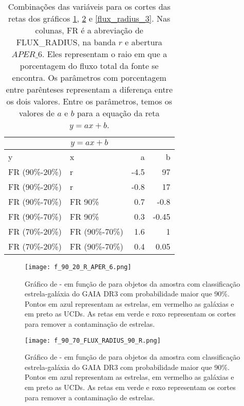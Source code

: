 \begin{table}[!ht]
    \centering
    \caption{Combinações das variáveis para os cortes das retas dos gráficos \ref{flux_radius_1}, \ref{flux_radius_2} e \ref{flux_radius_3}. Nas colunas, FR é a abreviação de FLUX\_RADIUS, na banda $r$ e abertura $APER\_6$. Eles representam o raio em que a porcentagem do fluxo total da fonte se encontra. Os parâmetros com porcentagem entre parênteses representam a diferença entre os dois valores. Entre os parâmetros, temos os valores de $a$ e $b$ para a equação da reta $y = ax + b$. }
        \begin{tabular}{l l r r}
        \hline
        \multicolumn{4}{c}{$y = ax + b$}\\
        \hline
        y & x & a & b\\
        \hline
        FR (90\%-20\%) & r & -4.5 & 97 \\
        FR (90\%-20\%) & r & -0.8 & 17 \\
        FR (90\%-70\%) & FR 90\% & 0.7 & -0.8 \\
        FR (90\%-70\%) & FR 90\% & 0.3 & -0.45 \\
        FR (70\%-20\%) & FR (90\%-70\%) & 1.6 & 1 \\
        FR (70\%-20\%) & FR (90\%-70\%) & 0.4 & 0.05 \\
        \hline
    \end{tabular}
    \label{cortes_flux_radius}
\end{table}

\begin{figure}[!ht]
    \begin{center}
    \texttt{[image: f\_90\_20\_R\_APER\_6.png]}
    \caption{Gráfico de  -  em função de  para objetos da amostra com classificação estrela-galáxia do GAIA DR3 com probabilidade maior que 90\%. Pontos em azul representam as estrelas, em vermelho as galáxias e em preto as UCDs. As retas em verde e roxo representam os cortes para remover a contaminação de estrelas.}
    \label{flux_radius_1}
    \end{center}
\end{figure}

\begin{figure}[!ht]
    \begin{center}
    \texttt{[image: f\_90\_70\_FLUX\_RADIUS\_90\_R.png]}
    \caption[]{Gráfico de  -  em função de  para objetos da amostra com classificação estrela-galáxia do GAIA DR3 com probabilidade maior que 90\%. Pontos em azul representam as estrelas, em vermelho as galáxias e em preto as UCDs. As retas em verde e roxo representam os cortes para remover a contaminação de estrelas.}
    \label{flux_radius_2}
    \end{center}
\end{figure}

